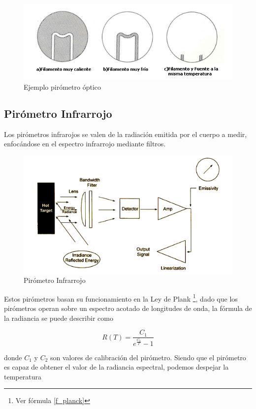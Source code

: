 \documentclass[12pt,a4paper]{article}
\begin{document}
			\begin{figure}[H]
				\centering\includegraphics[scale=0.75]{images/fila.png}\caption{Ejemplo pirómetro óptico}
			\end{figure}

		\subsection{Pirómetro Infrarrojo}
			Los pirómetros infrarojos se valen de la radiación emitida por el cuerpo a medir, enfocándose en el espectro infrarrojo mediante filtros.

			\begin{figure}[H]
				\centering\includegraphics[scale=0.3]{images/ir-pyro.png}\caption{Pirómetro Infrarrojo}
			\end{figure}

			Estos pirómetros basan su funcionamiento en la Ley de Plank \footnote{Ver fórmula \ref{f_planck}}, dado que los pirómetros operan sobre un espectro acotado de longitudes de onda, la fórmula de la radiancia se puede describir como

			\begin{equation}
				R(T) = \frac{C_1}{e^{\frac{C_2}{T}}-1}
			\end{equation}

			donde $C_1$ y $C_2$ son valores de calibración del pirómetro. Siendo que el pirómetro es capaz de obtener el valor de la radiancia espectral, podemos despejar la temperatura
\end{document}

